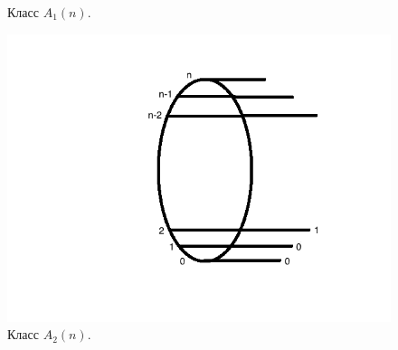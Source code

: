 \documentclass[oneside, final, 14pt]{extreport}
\begin{document}
\begin{figure}[h]
\begin{center}
\begin{minipage}[h]{0.3\linewidth}
 			\caption{Класс $A_1(n)$.}
 			\label{ris:A1}
 		\end{minipage}
 		\hfill 
 		\begin{minipage}[h]{0.3\linewidth}
 		\includegraphics[width=1\linewidth]{A2}
 		\caption{Класс $A_2(n)$.}
 		\label{ris:A2}
 	\end{minipage}
 	\end{center}
 \end{figure}
	
\end{document}
